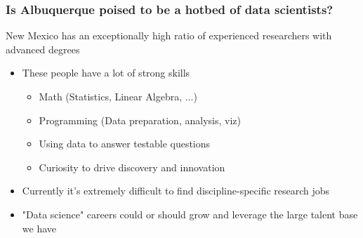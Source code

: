
\begin{frame}
\frametitle{Is Albuquerque poised to be a hotbed of data scientists?}
\begin{center}

\begin{block}{New Mexico has an exceptionally high ratio of experienced researchers with advanced degrees}
\begin{itemize}
    \item These people have a lot of strong skills
    \begin{itemize}
        \item Math (Statistics, Linear Algebra, ...)
        \item Programming (Data preparation, analysis, viz)
        \item Using data to answer testable questions
        \item Curiosity to drive discovery and innovation
    \end{itemize}
    \item Currently it's extremely difficult to find discipline-specific research jobs
	\item "Data science" careers could or should grow and leverage the large talent base we have 
\end{itemize}
\end{block}

\end{center}
\end{frame}

